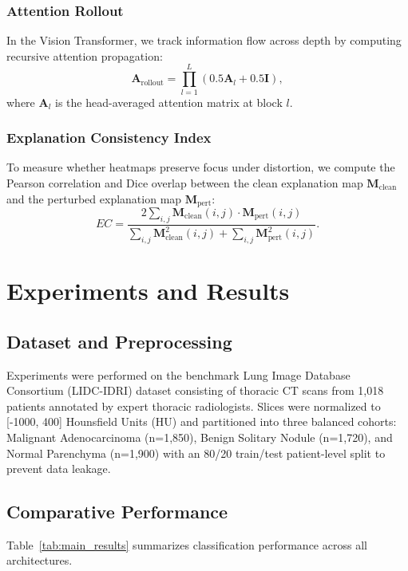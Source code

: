 \documentclass[journal]{IEEEtran}
\begin{document}
\subsubsection{Attention Rollout}
In the Vision Transformer, we track information flow across depth by computing recursive attention propagation:
\begin{equation}
\mathbf{A}_{\text{rollout}} = \prod_{l=1}^L \left( 0.5 \mathbf{A}_l + 0.5 \mathbf{I} \right),
\end{equation}
where $\mathbf{A}_l$ is the head-averaged attention matrix at block $l$.

\subsubsection{Explanation Consistency Index}
To measure whether heatmaps preserve focus under distortion, we compute the Pearson correlation and Dice overlap between the clean explanation map $\mathbf{M}_{\text{clean}}$ and the perturbed explanation map $\mathbf{M}_{\text{pert}}$:
\begin{equation}
EC = \frac{2 \sum_{i,j} \mathbf{M}_{\text{clean}}(i,j) \cdot \mathbf{M}_{\text{pert}}(i,j)}{\sum_{i,j} \mathbf{M}_{\text{clean}}^2(i,j) + \sum_{i,j} \mathbf{M}_{\text{pert}}^2(i,j)}.
\end{equation}

\section{Experiments and Results}

\subsection{Dataset and Preprocessing}
Experiments were performed on the benchmark Lung Image Database Consortium (LIDC-IDRI) dataset consisting of thoracic CT scans from 1,018 patients annotated by expert thoracic radiologists. Slices were normalized to [-1000, 400] Hounsfield Units (HU) and partitioned into three balanced cohorts: Malignant Adenocarcinoma (n=1,850), Benign Solitary Nodule (n=1,720), and Normal Parenchyma (n=1,900) with an 80/20 train/test patient-level split to prevent data leakage.

\subsection{Comparative Performance}
Table~\ref{tab:main_results} summarizes classification performance across all architectures.
\end{document}
